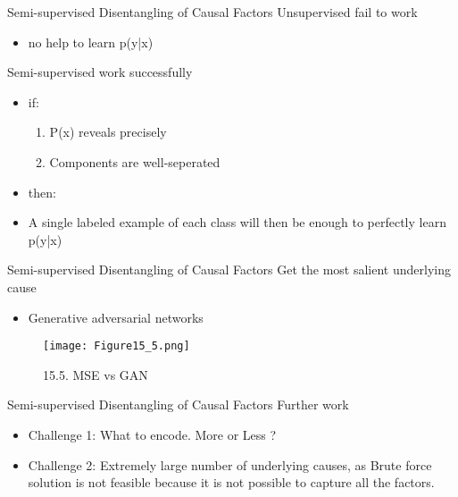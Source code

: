 \begin{frame}{Semi-supervised Disentangling of Causal Factors}
Unsupervised fail to work
\begin{itemize}
  \item no help to learn p(y|x)
\end{itemize}
Semi-supervised work successfully
\begin{itemize}
  \item if:
   \begin{enumerate} %
   \item P(x) reveals precisely
   \item Components are well-seperated
   \end{enumerate}
  \item then:
  \item A single labeled example of each class will then be enough to perfectly learn p(y|x)
\end{itemize}
\end{frame}

\begin{frame}{Semi-supervised Disentangling of Causal Factors}
Get the most salient underlying cause
\begin{itemize}
  \item Generative adversarial networks
\end{itemize}
\begin{figure}[t]
\centering
\texttt{[image: Figure15\_5.png]} %
\caption{15.5. MSE vs GAN}
\end{figure}
\end{frame}

\begin{frame}{Semi-supervised Disentangling of Causal Factors}
Further work
\begin{itemize}
  \item Challenge 1: What to encode. More or Less ?
  \item Challenge 2: Extremely large number of underlying causes, as Brute force solution is not feasible because it is not possible to capture all the factors.
\end{itemize}
\end{frame}


